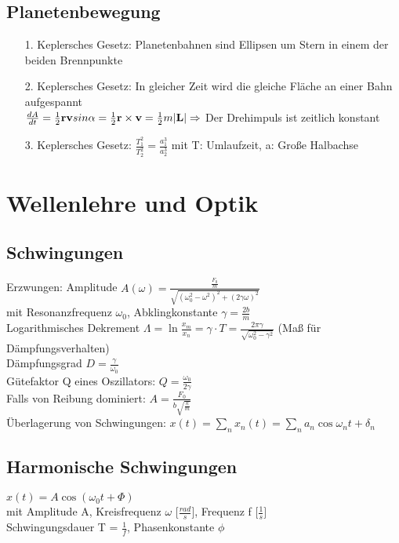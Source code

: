 \documentclass[fs, footer]{latex4ei}
\begin{document}
\begin{multicols*}{4}
\subsection{Planetenbewegung}
\begin{itemize}
\item[1.] Keplersches Gesetz: Planetenbahnen sind Ellipsen um Stern in einem der beiden Brennpunkte\\
\item[2.] Keplersches Gesetz: In gleicher Zeit wird die gleiche Fläche an einer Bahn aufgespannt\\$\frac{dA}{dt} = \frac{1}{2} \textbf{r} \textbf{v} sin \alpha = \frac{1}{2}\textbf{r} \times \textbf{v} = \frac{1}{2}m|\textbf{L}| \Rightarrow$ Der Drehimpuls ist zeitlich konstant\\
\item[3.] Keplersches Gesetz: $\frac{T_1^2}{T_2^2} = \frac{a_1^3}{a_2^3}$ mit T: Umlaufzeit, a: Große Halbachse\\
\end{itemize}

\section{Wellenlehre und Optik}
\subsection{Schwingungen}
Erzwungen: Amplitude $A(\omega) = \frac{\frac{F_0}{m}}{\sqrt{(\omega_0^2 - \omega^2)^2+ (2\gamma\omega)^2}}$\\ mit Resonanzfrequenz $\omega_0$, Abklingkonstante $\gamma = \frac{2b}{m}$\\

Logarithmisches Dekrement $\Lambda = \ln\frac{x_m}{x_n}=\gamma\cdot T = \frac{2\pi\gamma}{\sqrt{\omega_0^2 - \gamma^2}}$ (Maß für Dämpfungsverhalten)\\
Dämpfungsgrad $D = \frac{\gamma}{\omega_0}$\\
Gütefaktor Q eines Oszillators: $Q = \frac{\omega_0}{2\gamma}$\\

Falls von Reibung dominiert: $A = \frac{F_0}{b\sqrt{\frac{k}{m}}}$\\
Überlagerung von Schwingungen: $x(t)=\sum_nx_n(t)=\sum_na_n\cos{\omega_nt+\delta_n}$\\
\subsection{Harmonische Schwingungen} $x(t) = A \cos(\omega_0t + \Phi)$\\ mit Amplitude A, Kreisfrequenz $\omega$ [$\frac{rad}{s}$], Frequenz f [$\frac{1}{s}]$\\ Schwingungsdauer T = $\frac{1}{f}$, Phasenkonstante $\phi$\\

\end{multicols*}
\end{document}

